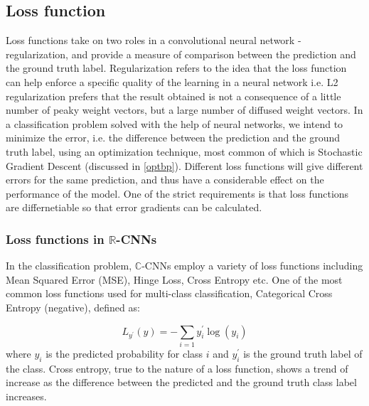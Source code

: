  \subsection{Loss function}
 Loss functions take on two roles in a convolutional neural network - regularization, and provide a measure of comparison between the prediction and the ground truth label. Regularization refers to the idea that the loss function can help enforce a specific quality of the learning in a neural network i.e. L2 regularization prefers that the result obtained is not a consequence of a little number of peaky weight vectors, but a large number of diffused weight vectors. In a classification problem solved with the help of neural networks, we intend to minimize the error, i.e. the difference between the prediction and the ground truth label, using an optimization technique, most common of which is Stochastic Gradient Descent (discussed in \ref{optbp}). Different loss functions will give different errors for the same prediction, and thus have a considerable effect on the performance of the model. One of the strict requirements is that loss functions are differnetiable so that error gradients can be calculated.
 
 
 
 \subsubsection{Loss functions in $\mathbb{R}$-CNNs}
 In the classification problem, $\mathbb{C}$-CNNs employ a variety of loss functions including Mean Squared Error (MSE), Hinge Loss, Cross Entropy etc. One of the most common loss functions used for multi-class classification, Categorical Cross Entropy (negative), defined as:
 
  \begin{equation}\label{rloss}
  L_{y^{'}}(y) = - \sum_{i=1} y_{i}^{'} \log(y_{i})
 \end{equation}
 where $y_{i}$ is the predicted probability for class $i$ and $y_{i}^{'}$ is the ground truth label of the class. Cross entropy, true to the nature of a loss function, shows a trend of increase as the difference between the predicted and the ground truth class label increases.
 
 
 
